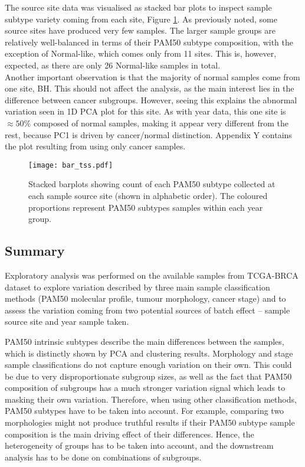     The source site data was visualised as stacked bar plots to inspect sample subtype variety coming from each site, Figure \ref{fig:bartss}. As previously noted, some source sites have produced very few samples. The larger sample groups are relatively well-balanced in terms of their PAM50 subtype composition, with the exception of Normal-like, which comes only from 11 sites. This is, however, expected, as there are only 26 Normal-like samples in total. \\
    
    Another important observation is that the majority of normal samples come from one site, BH. This should not affect the analysis, as the main interest lies in the difference between cancer subgroups. However, seeing this explains the abnormal variation seen in 1D PCA plot for this site. As with year data, this one site is $\approx50\%$ composed of normal samples, making it appear very different from the rest, because PC1 is driven by cancer/normal distinction. Appendix Y contains the plot resulting from using only cancer samples. 
  
    \newpage
    
            \begin{figure}[!h]
            \centering
            \texttt{[image: bar\_tss.pdf]}
            \caption[Stacked barplots of sample counts per year]{Stacked barplots showing count of each PAM50 subtype collected at each sample source site (shown in alphabetic order). The coloured proportions represent PAM50 subtypes samples within each year group. }
            \label{fig:bartss}
            \end{figure}
    
    
    \subsection{Summary}
    
   Exploratory analysis was performed on the available samples from TCGA-BRCA dataset to explore variation described by three main sample classification methods (PAM50 molecular profile, tumour morphology, cancer stage) and to assess the variation coming from two potential sources of batch effect -- sample source site and year sample taken. 

    PAM50 intrinsic subtypes describe the main differences between the samples, which is distinctly shown by PCA and clustering results. Morphology and stage sample classifications do not capture enough variation on their own. This could be due to very disproportionate subgroup sizes, as well as the fact that PAM50 composition of subgroups has a much stronger variation signal which leads to masking their own variation.
    Therefore, when using other classification methods, PAM50 subtypes have to be taken into account. For example, comparing two morphologies might not produce truthful results if their PAM50 subtype sample composition is the main driving effect of their differences. Hence, the heterogeneity of groups has to be taken into account, and the downstream analysis has to be done on combinations of subgroups. 

